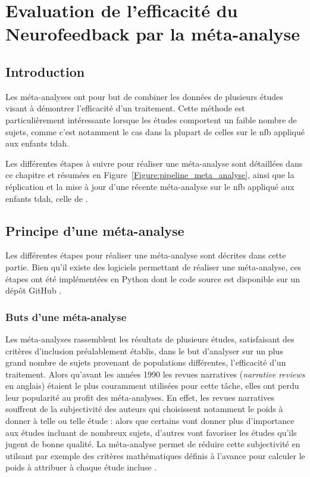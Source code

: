 \chapter{Evaluation de l'efficacité du Neurofeedback par la méta-analyse}

\section*{Introduction}
Les méta-analyses ont pour but de combiner les données de plusieurs études visant à démontrer l'efficacité d'un traitement. Cette méthode est
particulièrement intéressante lorsque les études comportent un faible nombre de sujets, comme c'est notamment le cas dans la plupart de celles sur 
le \gls{nfb} appliqué aux enfants \gls{tdah}.

Les différentes étapes à suivre pour réaliser une méta-analyse sont détaillées dans ce chapitre et résumées en Figure~\ref{Figure:pipeline_meta_analyse}, ainsi que la
réplication et la mise à jour d'une récente méta-analyse sur le \gls{nfb} appliqué aux enfants \gls{tdah}, celle de \citet{Cortese2016}.

\clearpage

\section{Principe d'une méta-analyse}

Les différentes étapes pour réaliser une méta-analyse sont décrites dans cette partie. Bien qu'il existe des logiciels permettant de réaliser une
méta-analyse, ces étapes ont été implémentées en Python dont le code source est disponible sur un dépôt GitHub \citep{Bussalb2019c}.

\subsection{Buts d'une méta-analyse}

Les méta-analyses rassemblent les résultats de plusieurs études, satisfaisant des critères d'inclusion préalablement établis, dans le but d'analyser
sur un plus grand nombre de sujets provenant de populations différentes, l'efficacité d'un traitement. Alors qu'avant les années 1990 les revues narratives
(\textit{narrative reviews} en anglais) étaient le plus couramment utilisées pour cette tâche, elles ont perdu leur popularité au profit des méta-analyses.
En effet, les revues narratives souffrent de la subjectivité des auteurs qui choisissent notamment le poids à donner à telle ou telle étude : alors que certains
vont donner plus d'importance aux études incluant de nombreux sujets, d'autres vont favoriser les études qu'ils jugent de bonne qualité. La méta-analyse permet 
de réduire cette subjectivité en utilsant par exemple des critères mathématiques définis à l'avance pour calculer le poids à attribuer à chaque étude incluse
\citep{Borenstein2009}.

